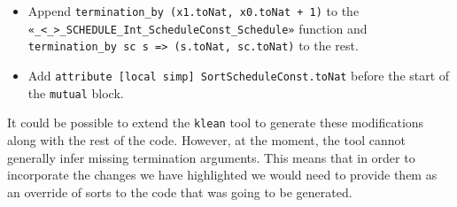 \begin{itemize}
\item Append \texttt{termination_by (x1.toNat, x0.toNat + 1)} to the \texttt{«_<_>_SCHEDULE_Int_ScheduleConst_Schedule»} function and \texttt{termination_by sc s => (s.toNat, sc.toNat)} to the rest.
\item Add \texttt{attribute [local simp] SortScheduleConst.toNat} before the start of the \texttt{mutual} block.
\end{itemize}

It could be possible to extend the \texttt{klean} tool to generate these modifications along with the rest of the code. However, at the moment, the tool cannot generally infer missing termination arguments. This means that in order to incorporate the changes we have highlighted we would need to provide them as an override of sorts to the code that was going to be generated.
